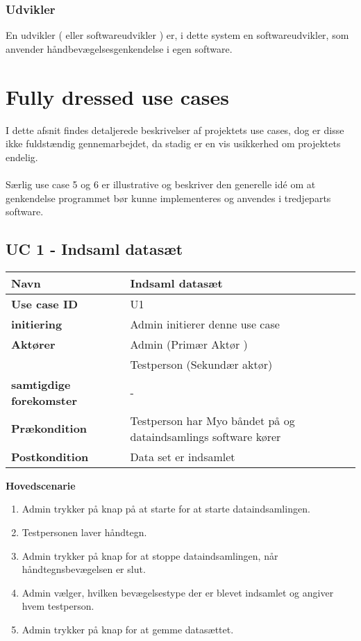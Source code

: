 \subsubsection*{Udvikler}
En udvikler ( eller softwareudvikler ) er, i dette system en softwareudvikler, som anvender håndbevægelsesgenkendelse i egen software.  

\section{Fully dressed use cases}
I dette afsnit findes detaljerede beskrivelser af projektets use cases, dog er disse ikke fuldstændig gennemarbejdet, da stadig er en vis usikkerhed om projektets endelig.
\\ \\Særlig use case 5 og 6 er illustrative og beskriver den generelle idé om at genkendelse programmet bør kunne implementeres og anvendes i tredjeparts software.
\subsection{UC 1 - Indsaml datasæt}
\begin{table}[htbp] 
	\begin{tabular}{|p{5cm}|p{9cm}|}
		\hline
		\textbf{Navn} & Indsaml datasæt \\ \hline
		\textbf{Use case ID} & U1 \\ \hline
		\textbf{initiering} & Admin initierer denne use case \\ \hline
		\textbf{Aktører} & Admin (Primær Aktør ) \\ & Testperson (Sekundær aktør) \\ \hline
		\textbf{samtigdige forekomster} & - \\ \hline
		\textbf{Prækondition} & Testperson har Myo båndet på og dataindsamlings software kører \\ \hline
		\textbf{Postkondition} & Data set er indsamlet \\ \hline
	\end{tabular}
\end{table}
\textbf{Hovedscenarie}
\begin{enumerate}
	\item Admin trykker på knap på at starte for at starte dataindsamlingen.
	\item Testpersonen laver håndtegn.
	\item Admin trykker på knap for at stoppe dataindsamlingen, når håndtegnsbevægelsen er slut.
	\item Admin vælger, hvilken bevægelsestype der er blevet indsamlet og angiver hvem testperson.
	\item Admin trykker på knap for at gemme datasættet.
\end{enumerate}

